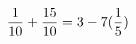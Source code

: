 \documentclass[preview]{standalone}
\begin{document}
\begin{align*}
\special{dvisvgm:raw <g id='unique000'>}\frac{1}{10} + \frac{15}{10} = 3 - 7(\frac{1}{5})\special{dvisvgm:raw </g>}
\end{align*}
\end{document}
